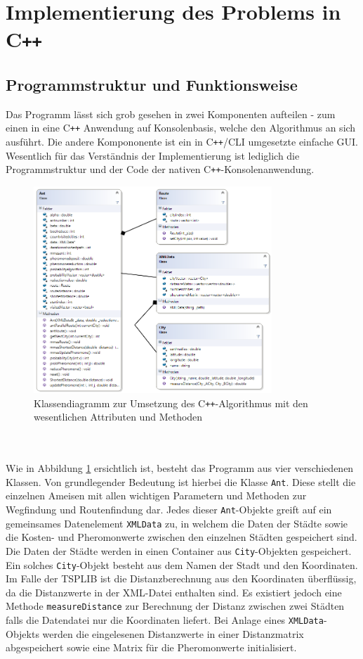 \documentclass[doktyp=barbeit, sprache=german]{TUBAFarbeiten}
\begin{document}
\section{Implementierung des Problems in C\texttt{++}}
\subsection{Programmstruktur und Funktionsweise}
\label{structure}
Das Programm lässt sich grob gesehen in zwei Komponenten aufteilen - zum einen in eine C\texttt{++} Anwendung auf Konsolenbasis, welche den Algorithmus an sich ausführt. Die andere Kompononente ist ein in C\texttt{++}/CLI umgesetzte einfache GUI. Wesentlich für das Verständnis der Implementierung ist lediglich die Programmstruktur und der Code der nativen C\texttt{++}-Konsolenanwendung. 
\begin{figure}
\captionsetup{justification=centering}
  \centering
     \includegraphics[width=0.8\textwidth]{images/classdiagram.png}
  \caption{Klassendiagramm zur Umsetzung des C\texttt{++}-Algorithmus mit den wesentlichen Attributen und Methoden}
  \label{img:classdiagram}
\end{figure}
\\\\Wie in Abbildung \ref{img:classdiagram} ersichtlich ist, besteht das Programm aus vier verschiedenen Klassen. Von grundlegender Bedeutung ist hierbei die Klasse \texttt{Ant}. Diese stellt die einzelnen Ameisen mit allen wichtigen Parametern und Methoden zur Wegfindung und Routenfindung dar. Jedes dieser \texttt{Ant}-Objekte greift auf ein gemeinsames Datenelement \texttt{XMLData} zu, in welchem die Daten der Städte sowie die Kosten- und Pheromonwerte zwischen den einzelnen Städten gespeichert sind. Die Daten der Städte werden in einen Container aus \texttt{City}-Objekten gespeichert. Ein solches \texttt{City}-Objekt besteht aus dem Namen der Stadt und den Koordinaten. Im Falle der TSPLIB ist die Distanzberechnung aus den Koordinaten überflüssig, da die Distanzwerte in der XML-Datei enthalten sind.   Es existiert jedoch eine Methode \texttt{measureDistance} zur Berechnung der Distanz zwischen zwei Städten falls die Datendatei nur die Koordinaten liefert. Bei Anlage eines \texttt{XMLData}-Objekts werden die eingelesenen Distanzwerte in einer Distanzmatrix abgespeichert sowie eine Matrix für die Pheromonwerte initialisiert.  
\end{document}
